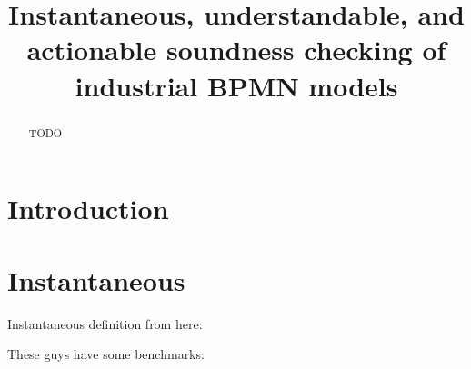 \documentclass[runningheads]{llncs}
\begin{document}
%
\title{Instantaneous, understandable, and actionable soundness checking of industrial BPMN models}
%
%
%
\maketitle              %
%
\begin{abstract}
TODO
\end{abstract}


\section{Introduction}
\cite{fahlandAnalysisDemandInstantaneous2011}

\cite{corradiniClassificationBPMNCollaborations2018}

\section{Instantaneous}
Instantaneous definition from here: \cite{fahlandAnalysisDemandInstantaneous2011}


These guys have some benchmarks:
\cite{corradiniFormalApproachAnalysis2021}
\end{document}
